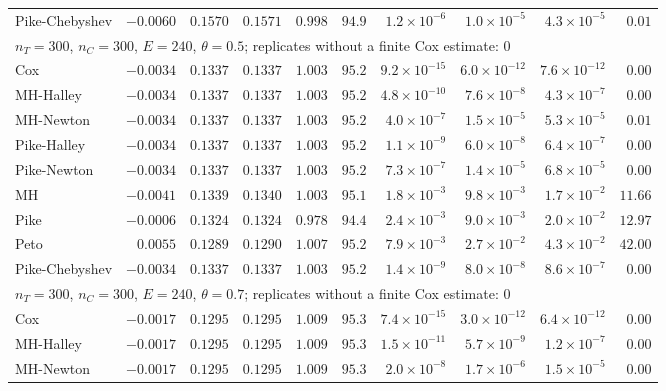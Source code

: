 \begin{landscape}
\begin{longtable}{lrrrrrrrrr}
Pike-Chebyshev & $-0.0060$ & $0.1570$ & $0.1571$ & $0.998$ & $94.9$ & $1.2 \times 10^{-6}$ & $1.0 \times 10^{-5}$ & $4.3 \times 10^{-5}$ & $0.01$ \\
\multicolumn{10}{l}{$n_T = 300$, $n_C = 300$, $E = 240$, $\theta = 0.5$; replicates without a finite Cox estimate: 0} \\
Cox & $-0.0034$ & $0.1337$ & $0.1337$ & $1.003$ & $95.2$ & $9.2 \times 10^{-15}$ & $6.0 \times 10^{-12}$ & $7.6 \times 10^{-12}$ & $0.00$ \\
MH-Halley & $-0.0034$ & $0.1337$ & $0.1337$ & $1.003$ & $95.2$ & $4.8 \times 10^{-10}$ & $7.6 \times 10^{-8}$ & $4.3 \times 10^{-7}$ & $0.00$ \\
MH-Newton & $-0.0034$ & $0.1337$ & $0.1337$ & $1.003$ & $95.2$ & $4.0 \times 10^{-7}$ & $1.5 \times 10^{-5}$ & $5.3 \times 10^{-5}$ & $0.01$ \\
Pike-Halley & $-0.0034$ & $0.1337$ & $0.1337$ & $1.003$ & $95.2$ & $1.1 \times 10^{-9}$ & $6.0 \times 10^{-8}$ & $6.4 \times 10^{-7}$ & $0.00$ \\
Pike-Newton & $-0.0034$ & $0.1337$ & $0.1337$ & $1.003$ & $95.2$ & $7.3 \times 10^{-7}$ & $1.4 \times 10^{-5}$ & $6.8 \times 10^{-5}$ & $0.00$ \\
MH & $-0.0041$ & $0.1339$ & $0.1340$ & $1.003$ & $95.1$ & $1.8 \times 10^{-3}$ & $9.8 \times 10^{-3}$ & $1.7 \times 10^{-2}$ & $11.66$ \\
Pike & $-0.0006$ & $0.1324$ & $0.1324$ & $0.978$ & $94.4$ & $2.4 \times 10^{-3}$ & $9.0 \times 10^{-3}$ & $2.0 \times 10^{-2}$ & $12.97$ \\
Peto & $0.0055$ & $0.1289$ & $0.1290$ & $1.007$ & $95.2$ & $7.9 \times 10^{-3}$ & $2.7 \times 10^{-2}$ & $4.3 \times 10^{-2}$ & $42.00$ \\
Pike-Chebyshev & $-0.0034$ & $0.1337$ & $0.1337$ & $1.003$ & $95.2$ & $1.4 \times 10^{-9}$ & $8.0 \times 10^{-8}$ & $8.6 \times 10^{-7}$ & $0.00$ \\
\multicolumn{10}{l}{$n_T = 300$, $n_C = 300$, $E = 240$, $\theta = 0.7$; replicates without a finite Cox estimate: 0} \\
Cox & $-0.0017$ & $0.1295$ & $0.1295$ & $1.009$ & $95.3$ & $7.4 \times 10^{-15}$ & $3.0 \times 10^{-12}$ & $6.4 \times 10^{-12}$ & $0.00$ \\
MH-Halley & $-0.0017$ & $0.1295$ & $0.1295$ & $1.009$ & $95.3$ & $1.5 \times 10^{-11}$ & $5.7 \times 10^{-9}$ & $1.2 \times 10^{-7}$ & $0.00$ \\
MH-Newton & $-0.0017$ & $0.1295$ & $0.1295$ & $1.009$ & $95.3$ & $2.0 \times 10^{-8}$ & $1.7 \times 10^{-6}$ & $1.5 \times 10^{-5}$ & $0.00$ \\

\end{longtable}
\end{landscape}
